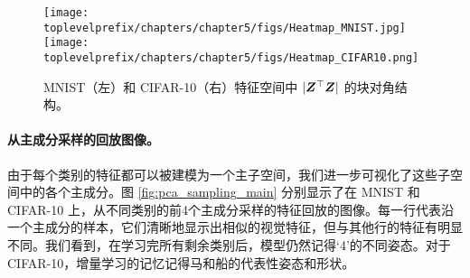 \documentclass[../../book-main_zh.tex]{subfiles}
\begin{document}
\begin{figure}[tb]
\centering
\texttt{[image: \\toplevelprefix/chapters/chapter5/figs/Heatmap\_MNIST.jpg]}  \texttt{[image: \\toplevelprefix/chapters/chapter5/figs/Heatmap\_CIFAR10.png]}
\caption{\small MNIST（左）和 CIFAR-10（右）特征空间中 $|\bm{Z}^\top \bm{Z}|$ 的块对角结构。}
\label{fig:cifar_10_pca_sampling_main}
\end{figure}



\paragraph{从主成分采样的回放图像。}
由于每个类别的特征都可以被建模为一个主子空间，我们进一步可视化了这些子空间中的各个主成分。图 \ref{fig:pca_sampling_main} 分别显示了在 MNIST 和 CIFAR-10 上，从不同类别的前4个主成分采样的特征回放的图像。每一行代表沿一个主成分的样本，它们清晰地显示出相似的视觉特征，但与其他行的特征有明显不同。我们看到，在学习完所有剩余类别后，模型仍然记得‘4’的不同姿态。对于 CIFAR-10，增量学习的记忆记得马和船的代表性姿态和形状。
\end{document}
